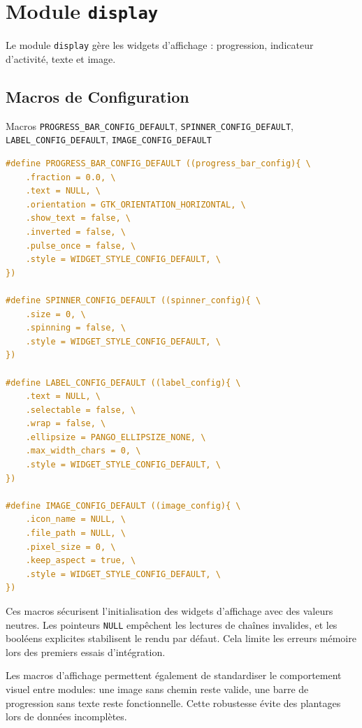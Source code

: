 \section{Module \texttt{display}}

Le module \texttt{display} gère les widgets d'affichage : progression, indicateur d'activité, texte et image.

\subsection{Macros de Configuration}

\begin{docbox}{Macros \texttt{PROGRESS\_BAR\_CONFIG\_DEFAULT}, \texttt{SPINNER\_CONFIG\_DEFAULT}, \texttt{LABEL\_CONFIG\_DEFAULT}, \texttt{IMAGE\_CONFIG\_DEFAULT}}
\begin{lstlisting}[language=C]
#define PROGRESS_BAR_CONFIG_DEFAULT ((progress_bar_config){ \
    .fraction = 0.0, \
    .text = NULL, \
    .orientation = GTK_ORIENTATION_HORIZONTAL, \
    .show_text = false, \
    .inverted = false, \
    .pulse_once = false, \
    .style = WIDGET_STYLE_CONFIG_DEFAULT, \
})

#define SPINNER_CONFIG_DEFAULT ((spinner_config){ \
    .size = 0, \
    .spinning = false, \
    .style = WIDGET_STYLE_CONFIG_DEFAULT, \
})

#define LABEL_CONFIG_DEFAULT ((label_config){ \
    .text = NULL, \
    .selectable = false, \
    .wrap = false, \
    .ellipsize = PANGO_ELLIPSIZE_NONE, \
    .max_width_chars = 0, \
    .style = WIDGET_STYLE_CONFIG_DEFAULT, \
})

#define IMAGE_CONFIG_DEFAULT ((image_config){ \
    .icon_name = NULL, \
    .file_path = NULL, \
    .pixel_size = 0, \
    .keep_aspect = true, \
    .style = WIDGET_STYLE_CONFIG_DEFAULT, \
})
\end{lstlisting}
\end{docbox}

Ces macros sécurisent l'initialisation des widgets d'affichage avec des valeurs neutres. Les pointeurs \texttt{NULL} empêchent les lectures de chaînes invalides, et les booléens explicites stabilisent le rendu par défaut. Cela limite les erreurs mémoire lors des premiers essais d'intégration.

Les macros d'affichage permettent également de standardiser le comportement visuel entre modules: une image sans chemin reste valide, une barre de progression sans texte reste fonctionnelle. Cette robustesse évite des plantages lors de données incomplètes.

